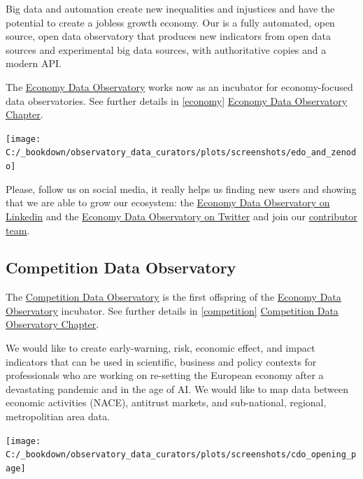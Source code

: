 \documentclass[
  a4paper,
  openany, a4paper, oneside]{book}
\begin{document}
Big data and automation create new inequalities and injustices and have the potential to create a jobless growth economy. Our is a fully automated, open source, open data observatory that produces new indicators from open data sources and experimental big data sources, with authoritative copies and a modern API.

The \href{https://economy.dataobservatory.eu/}{Economy Data Observatory} works now as an incubator for economy-focused data observatories. See further details in \ref{economy} \protect\hyperlink{economy}{Economy Data Observatory Chapter}.

\begin{center}\texttt{[image: C:/\_bookdown/observatory\_data\_curators/plots/screenshots/edo\_and\_zenodo]} \end{center}

Please, follow us on social media, it really helps us finding new users and showing that we are able to grow our ecosystem: the \href{https://www.linkedin.com/company/78562153/}{Economy Data Observatory on Linkedin} and the \href{https://twitter.com/EconDataObs/}{Economy Data Observatory on Twitter} and join our \href{https://economy.dataobservatory.eu/\#contributors}{contributor team}.

\hypertarget{competition-data-observatory}{%
\subsection*{Competition Data Observatory}\label{competition-data-observatory}}

The \href{https://competition-data-observatory.netlify.app/}{Competition Data Observatory} is the first offspring of the \href{https://economy.dataobservatory.eu/}{Economy Data Observatory} incubator. See further details in \ref{competition} \protect\hyperlink{competition}{Competition Data Observatory Chapter}.

We would like to create early-warning, risk, economic effect, and impact indicators that can be used in scientific, business and policy contexts for professionals who are working on re-setting the European economy after a devastating pandemic and in the age of AI. We would like to map data between economic activities (NACE), antitrust markets, and sub-national, regional, metropolitian area data.

\begin{center}\texttt{[image: C:/\_bookdown/observatory\_data\_curators/plots/screenshots/cdo\_opening\_page]} \end{center}
\end{document}
